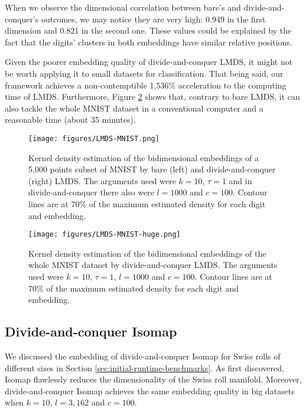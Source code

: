 When we observe the dimensional correlation between bare's and divide-and-conquer's outcomes, we may notice they are very high: 0.949 in the first dimension and 0.821 in the second one. These values could be explained by the fact that the digits' clusters in both embeddings have similar relative positions.

Given the poorer embedding quality of divide-and-conquer LMDS, it might not be worth applying it to small datasets for classification. That being said, our framework achieves a non-contemptible 1,536\% acceleration to the computing time of LMDS. Furthermore, Figure \ref{fig:LMDS-MNIST-huge} shows that, contrary to bare LMDS, it can also tackle the whole MNIST dataset in a conventional computer and a reasonable time (about 35 minutes).

\begin{figure}
    \centering
    \texttt{[image: figures/LMDS-MNIST.png]}
    \caption{Kernel density estimation of the bidimensional embeddings of a 5,000 points subset of MNIST by bare (left) and divide-and-conquer (right) LMDS. The arguments used were $k=10,\, \tau = 1$ and in divide-and-conquer there also were $l=1000$ and $c=100$. Contour lines are at 70\% of the maximum estimated density for each digit and embedding.}
    \label{fig:LMDS-MNIST}
\end{figure}

\begin{figure}
    \centering
    \texttt{[image: figures/LMDS-MNIST-huge.png]}
    \caption{Kernel density estimation of the bidimensional embeddings of the whole MNIST dataset by divide-and-conquer LMDS. The arguments used were $k=10,\, \tau = 1, \, l=1000$ and $c=100$. Contour lines are at 70\% of the maximum estimated density for each digit and embedding.}
    \label{fig:LMDS-MNIST-huge}
\end{figure}

\subsection{Divide-and-conquer Isomap}
\label{sec:dc-Isomap}

We discussed the embedding of divide-and-conquer Isomap for Swiss rolls of different sizes in Section \ref{sec:initial-runtime-benchmarks}. As \citet{Spiwokv2007} first discovered, Isomap flawlessly reduces the dimensionality of the Swiss roll manifold. Moreover, divide-and-conquer Isomap achieves the same embedding quality in big datasets when $k=10,\, l=3,162$ and $c=100$.

